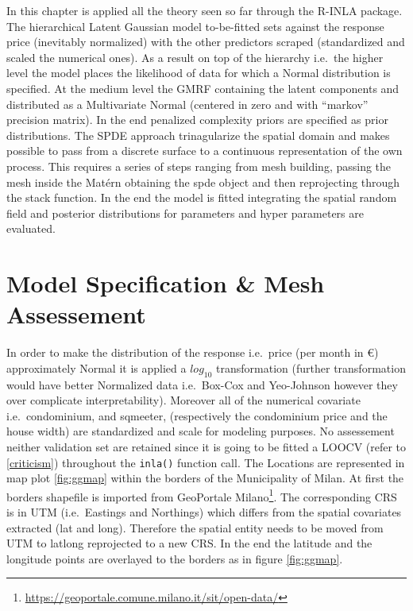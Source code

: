 \documentclass[
  12pt,
  a4paper,
  oneside]{book}
\newcommand{\passthrough}[1]{#1}
\DeclareRobustCommand{\href}[2]{#2\footnote{\url{#1}}}
\theoremstyle{definition}
\theoremstyle{definition}
\theoremstyle{definition}
\theoremstyle{remark}
\begin{document}
In this chapter is applied all the theory seen so far through the R-INLA package. The hierarchical Latent Gaussian model to-be-fitted sets against the response price (inevitably normalized) with the other predictors scraped (standardized and scaled the numerical ones). As a result on top of the hierarchy i.e.~the higher level the model places the likelihood of data for which a Normal distribution is specified. At the medium level the GMRF containing the latent components and distributed as a Multivariate Normal (centered in zero and with ``markov'' precision matrix). In the end penalized complexity priors are specified as prior distributions. The SPDE approach trinagularize the spatial domain and makes possible to pass from a discrete surface to a continuous representation of the own process. This requires a series of steps ranging from mesh building, passing the mesh inside the Matérn obtaining the spde object and then reprojecting through the stack function. In the end the model is fitted integrating the spatial random field and posterior distributions for parameters and hyper parameters are evaluated.

\hypertarget{modelspecandmesh}{%
\section{Model Specification \& Mesh Assessement}\label{modelspecandmesh}}

In order to make the distribution of the response i.e.~price (per month in €) approximately Normal it is applied a \(log_{10}\) transformation (further transformation would have better Normalized data i.e.~Box-Cox \citep{boxcox} and Yeo-Johnson \citep{yeojohnson} however they over complicate interpretability). Moreover all of the numerical covariate i.e.~condominium, and sqmeeter, (respectively the condominium price and the house width) are standardized and scale for modeling purposes. No assessement neither validation set are retained since it is going to be fitted a LOOCV (refer to \ref{criticism}) throughout the \passthrough{\lstinline!inla()!} function call. The Locations are represented in map plot \ref{fig:ggmap} within the borders of the Municipality of Milan. At first the borders shapefile is imported from \href{https://geoportale.comune.milano.it/sit/open-data/}{GeoPortale Milano}. The corresponding CRS is in UTM (i.e.~Eastings and Northings) which differs from the spatial covariates extracted (lat and long). Therefore the spatial entity needs to be moved from UTM to latlong reprojected to a new CRS. In the end the latitude and the longitude points are overlayed to the borders as in figure \ref{fig:ggmap}.
\end{document}
